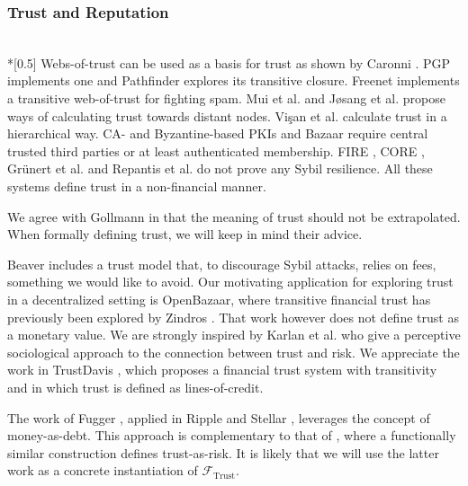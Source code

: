 \subsubsection{Trust and Reputation} \ \\*[0.5\baselineskip]
  Webs-of-trust can be used as a basis for trust as shown by Caronni \cite{wot}. PGP
  \cite{pgp} implements one and Pathfinder \cite{pathfinder} explores its transitive
  closure. Freenet \cite{freenet} implements a transitive web-of-trust for fighting spam.
  Mui et al. \cite{mui} and J\o{}sang et al. \cite{beta} propose ways of calculating trust
  towards distant nodes.  Vi\c{s}an et al. \cite{vpc} calculate trust in a hierarchical
  way. CA- and Byzantine-based \cite{byzantine} PKIs \cite{pki} and Bazaar \cite{bazaar}
  require central trusted third parties or at least authenticated membership. FIRE
  \cite{fire}, CORE \cite{core}, Gr\"unert et al. \cite{ghkkw} and Repantis et al.
  \cite{rk} do not prove any Sybil resilience. All these systems define trust in a
  non-financial manner.

  We agree with Gollmann \cite{badtrust} in that the meaning of trust should not be
  extrapolated. When formally defining trust, we will keep in mind their advice.

  Beaver \cite{beaver} includes a trust model that, to discourage Sybil attacks, relies on
  fees, something we would like to avoid. Our motivating application for exploring trust
  in a decentralized setting is OpenBazaar, where transitive financial trust has
  previously been explored by Zindros \cite{dionyziz}. That work however does not define
  trust as a monetary value. We are strongly inspired by Karlan et al. \cite{kmrs} who
  give a perceptive sociological approach to the connection between trust and risk. We
  appreciate the work in TrustDavis \cite{davis}, which proposes a financial trust system
  with transitivity and in which trust is defined as lines-of-credit.

  The work of Fugger \cite{iou}, applied in Ripple \cite{ripple} and Stellar
  \cite{stellar}, leverages the concept of money-as-debt. This approach is complementary
  to that of \cite{trustisrisk}, where a functionally similar construction defines
  trust-as-risk. It is likely that we will use the latter work as a concrete instantiation
  of $\mathcal{F}_{\mathrm{Trust}}$.
